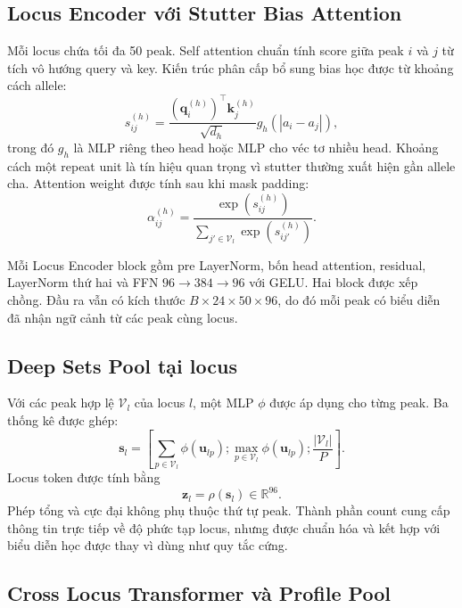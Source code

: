 \documentclass[12pt,a4paper]{article}
\begin{document}
\subsection{Locus Encoder với Stutter Bias Attention}

Mỗi locus chứa tối đa 50 peak. Self attention chuẩn tính score giữa peak \(i\) và \(j\) từ tích vô hướng query và key. Kiến trúc phân cấp bổ sung bias học được từ khoảng cách allele:
\begin{equation}
s_{ij}^{(h)}=
\frac{\left(\bm{q}_i^{(h)}\right)^\top\bm{k}_j^{(h)}}{\sqrt{d_h}}
g_h\left(|a_i-a_j|\right),
\end{equation}
trong đó \(g_h\) là MLP riêng theo head hoặc MLP cho véc tơ nhiều head. Khoảng cách một repeat unit là tín hiệu quan trọng vì stutter thường xuất hiện gần allele cha. Attention weight được tính sau khi mask padding:
\begin{equation}
\alpha_{ij}^{(h)}=
\frac{\exp(s_{ij}^{(h)})}
{\sum_{j'\in\mathcal{V}_l}\exp(s_{ij'}^{(h)})}.
\end{equation}

Mỗi Locus Encoder block gồm pre LayerNorm, bốn head attention, residual, LayerNorm thứ hai và FFN \(96\rightarrow384\rightarrow96\) với GELU. Hai block được xếp chồng. Đầu ra vẫn có kích thước \(B\times24\times50\times96\), do đó mỗi peak có biểu diễn đã nhận ngữ cảnh từ các peak cùng locus.

\subsection{Deep Sets Pool tại locus}

Với các peak hợp lệ \(\mathcal{V}_l\) của locus \(l\), một MLP \(\phi\) được áp dụng cho từng peak. Ba thống kê được ghép:
\begin{equation}
\bm{s}_l=
\left[
\sum_{p\in\mathcal{V}_l}\phi(\bm{u}_{lp});
\max_{p\in\mathcal{V}_l}\phi(\bm{u}_{lp});
\frac{|\mathcal{V}_l|}{P}
\right].
\end{equation}
Locus token được tính bằng
\begin{equation}
\bm{z}_l=\rho(\bm{s}_l)\in\mathbb{R}^{96}.
\end{equation}
Phép tổng và cực đại không phụ thuộc thứ tự peak. Thành phần count cung cấp thông tin trực tiếp về độ phức tạp locus, nhưng được chuẩn hóa và kết hợp với biểu diễn học được thay vì dùng như quy tắc cứng.

\subsection{Cross Locus Transformer và Profile Pool}
\end{document}
